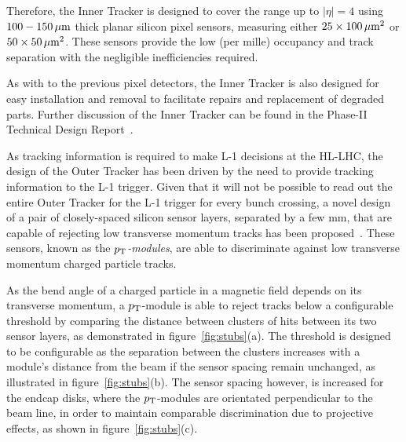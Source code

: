 Therefore, the Inner Tracker is designed to cover the range up to $|\eta| = 4$ using $100-150\,\mu\text{m}$ thick planar silicon pixel sensors, measuring either $25\times100\,\mu\text{m}^{2}$ or $50\times50\,\mu\text{m}^{2}$.
These sensors provide the low (per mille) occupancy and track separation with the negligible inefficiencies required.

As with to the previous pixel detectors, the Inner Tracker is also designed for easy installation and removal to facilitate repairs and replacement of degraded parts.
Further discussion of the Inner Tracker can be found in the Phase-II Technical Design Report~\cite{P2TrackerTDR}.

As tracking information is required to make L-1 decisions at the HL-LHC, the design of the Outer Tracker has been driven by the need to provide tracking information to the L-1 trigger.
Given that it will not be possible to read out the entire Outer Tracker for the L-1 trigger for every bunch crossing, a novel design of a pair of closely-spaced silicon sensor layers, separated by a few mm, that are capable of rejecting low transverse momentum tracks has been proposed~\cite{jjonespixel,markthesis}.
These sensors, known as the \emph{$p_{\mathrm{T}}$-modules}, are able to discriminate against low transverse momentum charged particle tracks.

As the bend angle of a charged particle in a magnetic field depends on its transverse momentum, a $p_{\mathrm{T}}$-module is able to  reject tracks below a configurable \pT threshold by comparing the distance between clusters of hits between its two sensor layers, as demonstrated in figure~\ref{fig:stubs}(a).
The \pT threshold is designed to be configurable as the separation between the clusters increases with a module's distance from the beam if the sensor spacing remain unchanged, as illustrated in figure~\ref{fig:stubs}(b).
The sensor spacing however, is increased for the endcap disks, where the $p_{\mathrm{T}}$-modules are orientated perpendicular to the beam line, in order to maintain comparable discrimination due to projective effects, as shown in figure~\ref{fig:stubs}(c).

